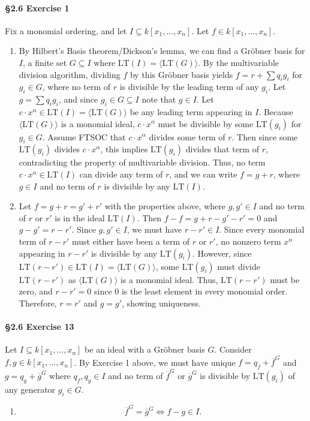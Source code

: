 \documentclass[12pt]{amsart}
\theoremstyle{definition}
\begin{document}
\begin{flushleft}
\paragraph{\S2.6 Exercise 1} Fix a monomial ordering, and let $I\subseteq k[x_1,\dots,x_n]$. Let $f \in k[x_1,\dots,x_n]$.
\begin{enumerate}
    \item[a.] By Hilbert's Basis theorem/Dickson's lemma, we can find a Gr\"obner basis for $I$, a finite set $G\subseteq I$ where $\text{LT}(I)=\langle \text{LT}(G)\rangle$. By the multivariable division algorithm, dividing $f$ by this Gr\"obner basis yields $f =r+ \sum q_i g_i$ for $g_i \in G$, where no term of $r$ is divisible by the leading term of any $g_i$. Let $g = \sum q_i g_i$, and since $g_i \in G \subseteq I$ note that $g \in I$. Let $c\cdot x^\alpha \in \text{LT}(I)=\langle \text{LT}(G)\rangle$ be any leading term appearing in $I$. Because $\langle \text{LT}(G)\rangle$ is a monomial ideal, $c\cdot x^\alpha$ must be divisible by some $\text{LT}(g_i)$ for $g_i \in G$. Assume FTSOC that $c\cdot x^\alpha$ divides some term of $r$. Then since some $\text{LT}(g_i)$ divides $c\cdot x^\alpha$, this implies $\text{LT}(g_i)$ divides that term of $r$, contradicting the property of multivariable division. Thus, no term $c\cdot x^\alpha \in \text{LT}(I)$ can divide any term of $r$, and we can write $f=g+r$, where $g \in I$ and no term of $r$ is divisible by any $\text{LT}(I)$. 
    \item[b.] Let $f = g+r=g'+r'$ with the properties above, where $g,g' \in I$ and no term of $r$ or $r'$ is in the ideal $\text{LT}(I)$. Then $f-f=g+r-g'-r'=0$ and $g-g'=r-r'$. Since $g,g'\in I$, we must have $r-r'\in I$. Since every monomial term of $r-r'$ must either have been a term of $r$ or $r'$, no nonzero term $x^\alpha$ appearing in $r-r'$ is divisible by any $\text{LT}(g_i)$. However, since $\text{LT}(r-r') \in \text{LT}(I)=\langle \text{LT}(G)\rangle$, some $\text{LT}(g_i)$ must divide $\text{LT}(r-r')$ as $\langle \text{LT}(G)\rangle$ is a monomial ideal. Thus, $\text{LT}(r-r')$ must be zero, and $r-r'=0$ since $0$ is the least element in every monomial order. Therefore, $r=r'$ and $g=g'$, showing uniqueness.
\end{enumerate}

\newpage{}
\paragraph{\S2.6 Exercise 13} Let $I \subseteq k[x_1,\dots,x_n]$ be an ideal with a Gr\"obner basis $G$. Consider $f,g\in k[x_1,\dots,x_n]$. By Exercise 1 above, we must have unique $f = q_f + \overline f^G$ and $g = q_g + \overline g^G$ where $q_f,q_g \in I$ and no term of $\overline f ^G$ or $\overline g^G$ is divisible by $\text{LT}(g_i)$ of any generator $g_i \in G$.
\begin{enumerate}
    \item[a.] 
    \[ \overline f^ G = \overline g^ G \iff f-g\in I.\]
    

\end{enumerate}
\end{flushleft}
\end{document}
